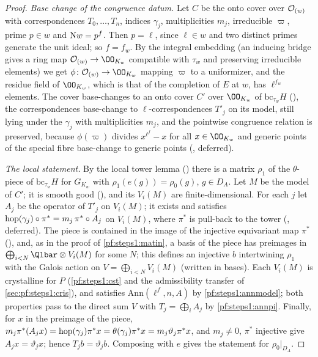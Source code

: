 \begin{proof}
\emph{Base change of the congruence datum.} Let $C$ be the onto cover over $\mathcal{O}_{(w)}$ with correspondences $T_0,\dots,T_n$,
indices $\gamma_j$, multiplicities $m_j$, irreducible $\varpi$, prime $p\in w$ and $\mathrm{N}w=p^f$. Then $p=\ell$, since
$\ell\in w$ and two distinct primes generate the unit ideal; so $f=f_w$. By the integral embedding
 (an inducing bridge gives a ring map $\stepsIOw\to\OO_{K_w}$ compatible with $\tau_w$ and
preserving irreducible elements) we get $\phi\colon\stepsIOw\to\OO_{K_w}$ mapping $\varpi$ to a uniformizer, and the residue field
of $\OO_{K_w}$, which is that of the completion of $E$ at $w$, has $\ell^{f_w}$ elements.
The cover base-changes to an onto cover $C'$ over $\OO_{K_w}$ of $\mathrm{bc}_{\tau_w}H$ (),
the correspondences base-change to $\ell$-correspondences $T'_j$ on its model, still lying under the $\gamma_j$ with
multiplicities $m_j$, and the pointwise congruence relation is preserved, because $\phi(\varpi)$ divides $x^{\ell^f}-x$ for all
$x\in\OO_{K_w}$ and generic points of the special fibre base-change to generic points
(, deferred).

\emph{The local statement.} By the local tower lemma () there is a matrix $\rho_1$
of the $\theta$-piece of $\mathrm{bc}_{\tau_w}H$ for $G_{K_w}$ with $\rho_1(e(g))=\rho_0(g)$, $g\in D_A$. Let $M$ be the model of
$C'$; it is smooth good (), and its $V_i(M)$ are finite-dimensional. For each $j$ let
$A_j$ be the operator of $T'_j$ on $V_i(M)$; it exists and satisfies $\mathrm{hop}(\gamma_j)\circ\pi^*=m_j\,\pi^*\circ A_j$ on
$V_i(M)$, where $\pi^*$ is pull-back to the tower (, deferred). The
piece is contained in the image of the injective equivariant map $\pi^*$ (), and,
as in the proof of \cref{pf:steps1:matin}, a basis of the piece has preimages in $\bigoplus_{i<N}\Qlbar\otimes V_i(M)$ for some
$N$; this defines an injective $b$ intertwining $\rho_1$ with the Galois action on $V=\bigoplus_{i<N}V_i(M)$ (written in bases).
Each $V_i(M)$ is crystalline for $P$ (\cref{pf:steps1:cst} and the admissibility transfer of \cref{sec:pf:steps1:cris}), and
satisfies $\mathrm{Ann}(\ell^{f},n,A)$ by \cref{pf:steps1:annmodel}; both properties pass to the direct sum $V$ with
$T_j=\bigoplus_iA_j$ by \cref{pf:steps1:annpi}. Finally, for $x$ in
the preimage of the piece, $m_j\pi^*(A_jx)=\mathrm{hop}(\gamma_j)\pi^*x=\theta(\gamma_j)\pi^*x=m_j\vartheta_j\pi^*x$, and $m_j\ne0$,
$\pi^*$ injective give $A_jx=\vartheta_jx$; hence $T_jb=\vartheta_jb$. Composing with $e$ gives the statement for $\rho_0|_{D_A}$.
\end{proof}

